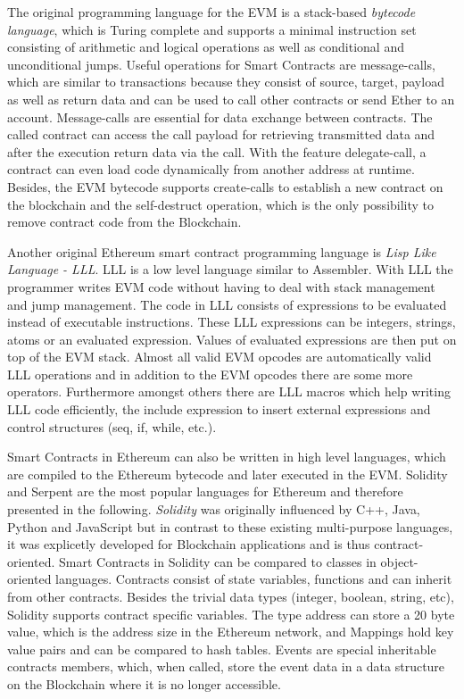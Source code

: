 \documentclass[conference]{IEEEtran}
\begin{document}
The original programming language for the EVM is a stack-based \textit{bytecode language}, which is Turing complete and supports a minimal instruction set consisting of arithmetic and logical operations as well as conditional and unconditional jumps. Useful operations for Smart Contracts are message-calls, which are similar to transactions because they consist of source, target, payload as well as return data and can be used to call other contracts or send Ether to an account. Message-calls are essential for data exchange between contracts. The called contract can access the call payload for retrieving transmitted data and after the execution return data via the call. With the feature delegate-call, a contract can even load code dynamically from another address at runtime. Besides, the EVM bytecode supports create-calls to establish a new contract on the blockchain and the self-destruct operation, which is the only possibility to remove contract code from the Blockchain. \cite{Bartoletti2017} \cite{McAdams2017} \cite{Solidity2017}\par 
Another original Ethereum smart contract programming language is \textit{Lisp Like Language - LLL}. LLL is a low level language similar to Assembler. With LLL the programmer writes EVM code without having to deal with stack management and jump management. The code in LLL consists of expressions to be evaluated instead of executable instructions. These LLL expressions can be integers, strings, atoms or an evaluated expression. Values of evaluated expressions are then put on top of the EVM stack. Almost all valid EVM opcodes are automatically valid LLL operations and in addition to the EVM opcodes there are some more operators. Furthermore amongst others there are LLL macros which help writing LLL code efficiently, the include expression to insert external expressions and control structures (seq, if, while, etc.). \cite{Edgington2017} \par 
Smart Contracts in Ethereum can also be written in high level languages, which are compiled to the Ethereum bytecode and later executed in the EVM. Solidity and Serpent are the most popular languages for Ethereum and therefore presented in the following. \textit{Solidity} was originally influenced by C++, Java, Python and JavaScript but in contrast to these existing multi-purpose languages, it was explicetly developed for Blockchain applications and is thus contract-oriented. Smart Contracts in Solidity can be compared to classes in object-oriented languages. Contracts consist of state variables, functions and can inherit from other contracts. Besides the trivial data types (integer, boolean, string, etc), Solidity supports contract specific variables. The type address can store a 20 byte value, which is the address size in the Ethereum network, and Mappings hold key value pairs and can be compared to hash tables. Events are special inheritable contracts members, which, when called, store the event data in a data structure on the Blockchain where it is no longer accessible. \cite{Solidity2017} \cite{McAdams2017} \par 
\end{document}
